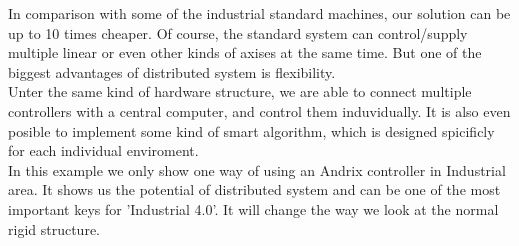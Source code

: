 \documentclass[11pt,a4paper]{article}
\begin{document}
In comparison with some of the industrial standard machines, our solution can be up to 10 times cheaper. Of course, the standard system can control/supply multiple linear or even other kinds of axises at the same time. But one of the biggest advantages of distributed system is flexibility.\\

Unter the same kind of hardware structure, we are able to connect multiple controllers with a central computer, and control them induvidually. It is also even posible to implement some kind of smart algorithm, which is designed spicificly for each individual enviroment.\\

In this example we only show one way of using an Andrix controller in Industrial area. It shows us the potential of distributed system and can be one of the most important keys for 'Industrial 4.0'. It will change the way we look at the normal rigid structure.\\
\end{document}
